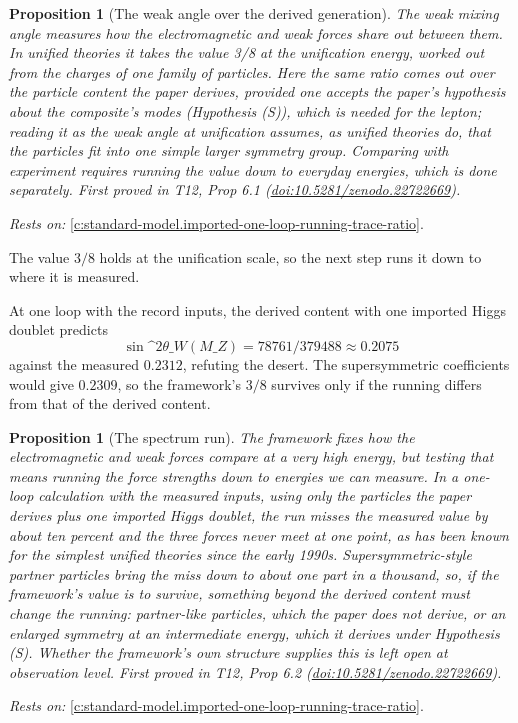 \documentclass[11pt]{article}
\newtheorem{proposition}[theorem]{Proposition}
\theoremstyle{definition}
\theoremstyle{plain}
\begin{document}
\begin{proposition}[The weak angle over the derived generation]\label{c:standard-model.weak-angle-over-derived-generation}
The weak mixing angle measures how the electromagnetic and weak forces share out between them. In unified theories it takes the value 3/8 at the unification energy, worked out from the charges of one family of particles. Here the same ratio comes out over the particle content the paper derives, provided one accepts the paper's hypothesis about the composite's modes (Hypothesis (S)), which is needed for the lepton; reading it as the weak angle at unification assumes, as unified theories do, that the particles fit into one simple larger symmetry group. Comparing with experiment requires running the value down to everyday energies, which is done separately.
\emph{First proved in} T12, Prop 6.1 (\href{https://doi.org/10.5281/zenodo.22722669}{doi:10.5281/zenodo.22722669}).
\end{proposition}
\noindent\emph{Rests on:} \ref{c:standard-model.imported-one-loop-running-trace-ratio}.

The value $3/8$ holds at the unification scale, so the next step runs it down to where it is measured.

At one loop with the record inputs, the derived content with one imported Higgs doublet predicts \[ \sin\^{}{2}\theta\_{W}(M\_{Z}) = 78761/379488 \approx 0.2075 \] against the measured $0.2312$, refuting the desert. The supersymmetric coefficients would give $0.2309$, so the framework's $3/8$ survives only if the running differs from that of the derived content.

\begin{proposition}[The spectrum run]\label{c:standard-model.spectrum-run}
The framework fixes how the electromagnetic and weak forces compare at a very high energy, but testing that means running the force strengths down to energies we can measure. In a one-loop calculation with the measured inputs, using only the particles the paper derives plus one imported Higgs doublet, the run misses the measured value by about ten percent and the three forces never meet at one point, as has been known for the simplest unified theories since the early 1990s. Supersymmetric-style partner particles bring the miss down to about one part in a thousand, so, if the framework's value is to survive, something beyond the derived content must change the running: partner-like particles, which the paper does not derive, or an enlarged symmetry at an intermediate energy, which it derives under Hypothesis (S). Whether the framework's own structure supplies this is left open at observation level.
\emph{First proved in} T12, Prop 6.2 (\href{https://doi.org/10.5281/zenodo.22722669}{doi:10.5281/zenodo.22722669}).
\end{proposition}
\noindent\emph{Rests on:} \ref{c:standard-model.imported-one-loop-running-trace-ratio}.
\end{document}
